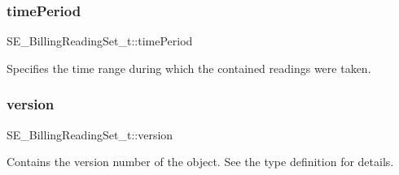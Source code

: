 \subsubsection{\texorpdfstring{time\+Period}{timePeriod}}
{\footnotesize\ttfamily S\+E\+\_\+\+Billing\+Reading\+Set\+\_\+t\+::time\+Period}

Specifies the time range during which the contained readings were taken. \mbox{\label{group__BillingReadingSet_ga6cf80b1bd407c3e29e5504fd19cd6359}} 
\subsubsection{\texorpdfstring{version}{version}}
{\footnotesize\ttfamily S\+E\+\_\+\+Billing\+Reading\+Set\+\_\+t\+::version}

Contains the version number of the object. See the type definition for details. 